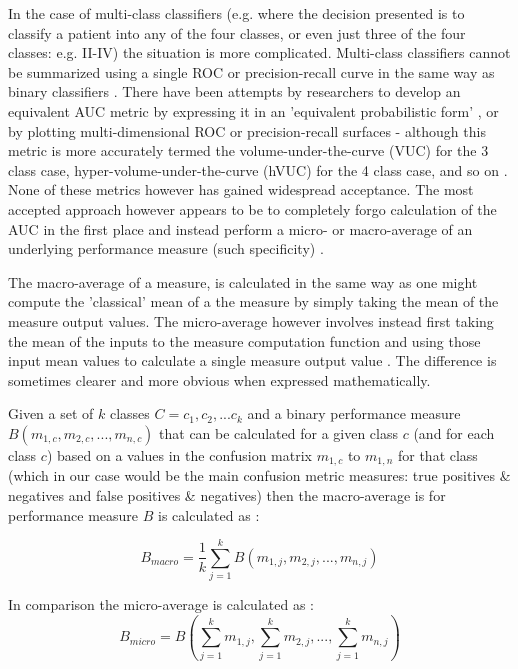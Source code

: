 \documentclass[]{article}
\begin{document}
In the case of multi-class classifiers (e.g. where the decision presented is to classify a patient into any of the four classes, or even just three of the four classes: e.g. II-IV) the situation is more complicated. Multi-class classifiers cannot be summarized using a single ROC or precision-recall curve in the same way as binary classifiers \cite{Sokolova2009,Flach2004,Fieldsend2005,Hand2001a,Hyndman2010,Kautz2017}. There have been attempts by researchers to develop an equivalent AUC metric by expressing it in an 'equivalent probabilistic form' \cite{Hand2001a}, or by plotting multi-dimensional ROC or precision-recall surfaces - although this metric is more accurately termed the volume-under-the-curve (VUC) for the 3 class case, hyper-volume-under-the-curve (hVUC) for the 4 class case, and so on \cite{Fieldsend2005}. None of these metrics however has gained widespread acceptance. The most accepted approach however appears to be to completely forgo calculation of the AUC in the first place and instead perform a micro- or macro-average of an underlying performance measure (such specificity) \cite{Flach2004,Sokolova2009,Hyndman2010}. 

The macro-average of a measure, is calculated in the same way as one might compute the 'classical' mean of a the measure by simply taking the mean of the measure output values. The micro-average however involves instead first taking the mean of the inputs to the measure computation function and using those input mean values to calculate a single measure output value \cite{VanAsch2013}. The difference is sometimes clearer and more obvious when expressed mathematically.

Given a set of $k$ classes $C = {c_1,c_2,...c_k}$ and a binary performance measure $B(m_{1,c},m_{2,c},...,m_{n,c})$ that can be calculated for a given class $c$ (and for each class $c$) based on a values in the confusion matrix $m_{1,c}$ to $m_{1,n}$ for that class (which in our case would be the main confusion metric measures: true positives \& negatives and false positives \& negatives) then the macro-average is for performance measure $B$ is calculated as \cite{VanAsch2013,Forman2010,Tsoumakas2009}:

\begin{equation}
B_{macro} = \frac{1}{k}\sum\limits_{j=1}^{k}B(m_{1,j},m_{2,j},...,m_{n,j})
\end{equation}

\noindent In comparison the micro-average is calculated as \cite{VanAsch2013,Forman2010,Tsoumakas2009}:
\begin{equation}
B_{micro} = B(\sum\limits_{j=1}^{k}m_{1,j},\sum\limits_{j=1}^{k}m_{2,j},...,\sum\limits_{j=1}^{k}m_{n,j})
\end{equation}
\end{document}
